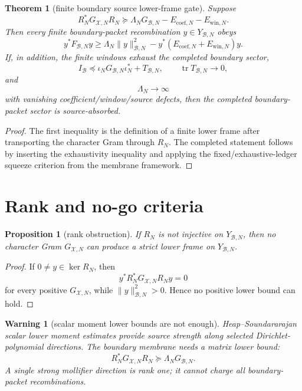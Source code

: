 \documentclass[11pt]{article}
\newtheorem{theorem}{Theorem}
\newtheorem{proposition}{Proposition}
\newtheorem{warning}{Warning}
\newcommand{\cB}{\mathcal B}
\newcommand{\cX}{\mathcal X}
\begin{document}
\begin{theorem}[finite boundary source lower-frame gate]
Suppose
\[
        R_N^*G_{\cX,N}R_N
        \succeq
        \Lambda_N G_{\cB,N}
        -
        E_{\mathrm{coef},N}
        -
        E_{\mathrm{win},N}.
\]
Then every finite boundary-packet recombination \(y\in Y_{\cB,N}\) obeys
\[
        y^*F_{\cB,N}y
        \ge
        \Lambda_N\|y\|_{\cB,N}^2
        -
        y^*(E_{\mathrm{coef},N}+E_{\mathrm{win},N})y.
\]
If, in addition, the finite windows exhaust the completed boundary sector,
\[
        I_{\cB}
        \preceq
        \iota_NG_{\cB,N}\iota_N^*
        +
        T_{\cB,N},
        \qquad
        \operatorname{tr}T_{\cB,N}\to0,
\]
and
\[
        \Lambda_N\to\infty
\]
with vanishing coefficient/window/source defects, then the completed boundary-packet sector is source-absorbed.
\end{theorem}

\begin{proof}
The first inequality is the definition of a finite lower frame after transporting the character Gram through \(R_N\). The completed statement follows by inserting the exhaustivity inequality and applying the fixed/exhaustive-ledger squeeze criterion from the membrane framework.
\end{proof}

\section{Rank and no-go criteria}

\begin{proposition}[rank obstruction]
If \(R_N\) is not injective on \(Y_{\cB,N}\), then no character Gram \(G_{\cX,N}\) can produce a strict lower frame on \(Y_{\cB,N}\).
\end{proposition}

\begin{proof}
If \(0\ne y\in\ker R_N\), then
\[
        y^*R_N^*G_{\cX,N}R_Ny=0
\]
for every positive \(G_{\cX,N}\), while \(\|y\|_{\cB,N}^2>0\). Hence no positive lower bound can hold.
\end{proof}

\begin{warning}[scalar moment lower bounds are not enough]
Heap--Soundararajan scalar lower moment estimates provide source strength along selected Dirichlet-polynomial directions. The boundary membrane needs a matrix lower bound:
\[
        R_N^*G_{\cX,N}R_N\succeq \Lambda_NG_{\cB,N}.
\]
A single strong mollifier direction is rank one; it cannot charge all boundary-packet recombinations.
\end{warning}
\end{document}
